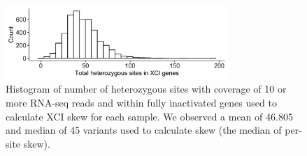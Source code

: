 \begin{figure}[ht]
    \centering
    \includegraphics[width=0.75\textwidth]{chapter4/Figures/Supplementary_Figure_1.png}
    \caption{
        Histogram of number of heterozygous sites with coverage of 10 or more RNA-seq reads and within fully inactivated genes used to calculate XCI skew for each sample. We observed a mean of 46.805 and median of 45 variants used to calculate skew (the median of per-site skew). 
    }
    \label{fig:supp_fig4.1}
\end{figure}